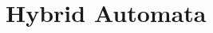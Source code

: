 \documentclass[12pt]{article}
\begin{document}
%
%
%


\newpage
\section*{Hybrid Automata}
\end{document}

